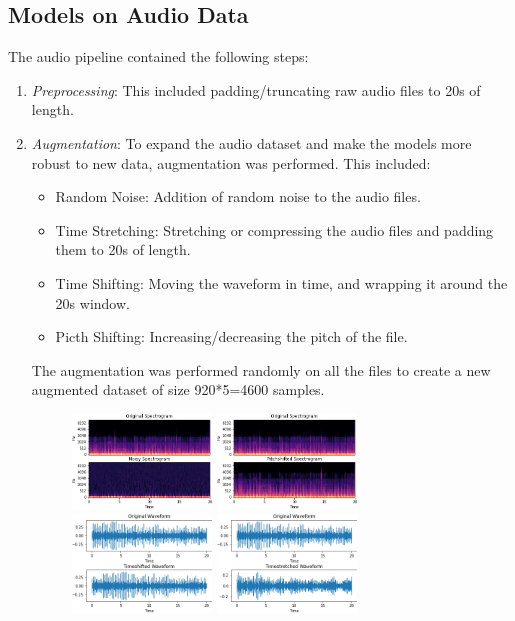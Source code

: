 \documentclass[10pt,twocolumn,letterpaper]{article}
\begin{document}
\subsection*{Models on Audio Data}
The audio pipeline contained the following steps:
\begin{enumerate}
    \item \textit{Preprocessing}:
    This included padding/truncating raw audio files to 20s of length.
    \item \textit{Augmentation}:
    To expand the audio dataset and make the models more robust to new data, augmentation was performed. This included:
    \begin{itemize}
        \item Random Noise: Addition of random noise to the audio files.
        \item Time Stretching: Stretching or compressing the audio files and padding them to 20s of length.
        \item Time Shifting: Moving the waveform in time, and wrapping it around the 20s window.
        \item Picth Shifting: Increasing/decreasing the pitch of the file.
    \end{itemize}
    The augmentation was performed randomly on all the files to create a new augmented dataset of size 920*5=4600 samples.
    \begin{figure}[htbp]
        \centerline{\includegraphics[width=0.35\textwidth]{Noisy.png}} \centerline{\includegraphics[width=0.35\textwidth]{Pitchshifted.png}} \centerline{\includegraphics[width=0.35\textwidth]{timeshifted.png}} \centerline{\includegraphics[width=0.35\textwidth]{Timestretched.png}}

\end{figure}
\end{enumerate}
\end{document}
